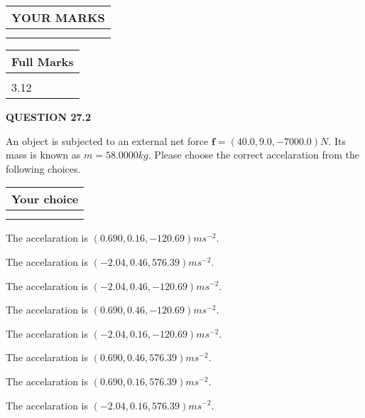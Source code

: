 \documentclass[12pt]{article}
\begin{document}
   
  
\vspace{0.2in}
  
\noindent\begin{tabular}{|l|}
\hline
 YOUR MARKS  \\
\hline
 \\ 
 \\ 
\hline
\end{tabular}
\hspace{0.05in} \begin{tabular}{|l|}
\hline
 Full Marks  \\
\hline
 \\ 
3.12 \\
\hline
\end{tabular}
{\textbf{\Large{QUESTION
27.2 
}}}
  
  
 
 
An object is subjected to an external net force $\mathbf{f}=
(40.0 , 9.0 , -7000.0) N$.
Its mass is known as $m= %
58.0000 kg$. Please choose the
correct accelaration from the following choices.
 
  
  
\noindent\hspace{3.0in} \begin{tabular}{|l|}
\hline
Your choice \\
\hline
 \\ 
 \\ 
\hline
\end{tabular}
  
  
 
 
The accelaration is $  %
(
0.690,
0.16,
-120.69)
ms^{-2} $.
 
 
The accelaration is $  %
(
-2.04,
0.46,
576.39)
ms^{-2} $.
 
 
The accelaration is $  %
(
-2.04,
0.46,
-120.69)
ms^{-2} $.
 
 
The accelaration is $  %
(
0.690,
0.46,
-120.69)
ms^{-2} $.
 
 
The accelaration is $  %
(
-2.04,
0.16,
-120.69)
ms^{-2} $.
 
 
The accelaration is $  %
(
0.690,
0.46,
576.39)
ms^{-2} $.
 
 
The accelaration is $  %
(
0.690,
0.16,
576.39)
ms^{-2} $.
 
 
The accelaration is $  %
(
-2.04,
0.16,
576.39)
ms^{-2} $.
 
\end{document}
